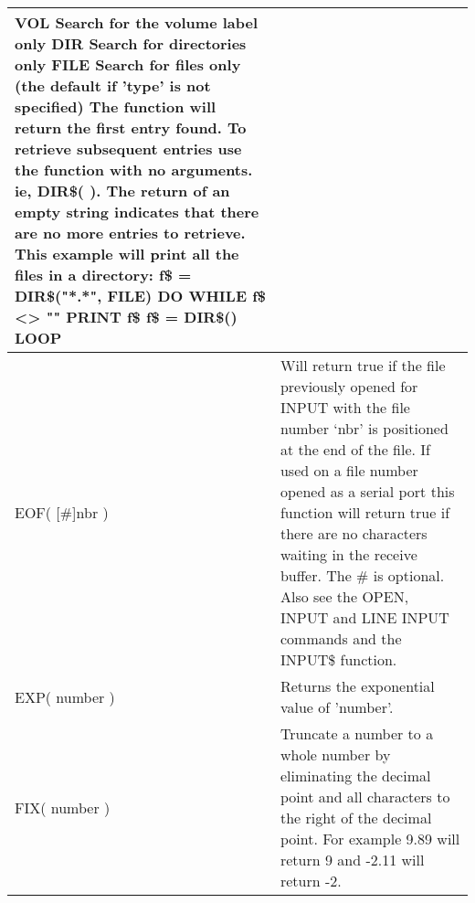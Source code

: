 \documentclass[11pt,fleqn]{book} %
\numberwithin{equation}{section} %
\numberwithin{figure}{section} %
\numberwithin{table}{section} %
\begin{document}
\begin{table}[]
\begin{tabular}{|p{4cm}|p{10cm}|}
VOL
Search for the volume label only
DIR
Search for directories only
FILE
Search for files only (the default if 'type' is not specified)
The function will return the first entry found. To retrieve subsequent
entries use the function with no arguments. ie, DIR\$( ). The return of
an empty string indicates that there are no more entries to retrieve.
This example will print all the files in a directory:
f\$ = DIR\$("*.*", FILE)
DO WHILE f\$ <> ""
PRINT f\$
f\$ = DIR\$()
LOOP
\\ \hline
EOF( [\#]nbr ) & Will return true if the file previously opened for INPUT with the file
number ‘nbr’ is positioned at the end of the file.
If used on a file number opened as a serial port this function will return
true if there are no characters waiting in the receive buffer.
The \# is optional. Also see the OPEN, INPUT and LINE INPUT
commands and the INPUT\$ function.
\\ \hline
EXP( number ) & Returns the exponential value of 'number'.
\\ \hline
FIX( number ) & Truncate a number to a whole number by eliminating the decimal point
and all characters to the right of the decimal point.
For example 9.89 will return 9 and -2.11 will return -2.


\end{tabular}
\end{table}
\end{document}
